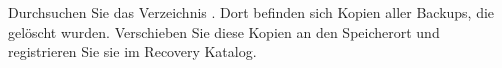     \item Durchsuchen Sie das Verzeichnis . Dort befinden sich Kopien aller Backups, die gel\"oscht wurden. Verschieben Sie diese Kopien an den Speicherort  und registrieren Sie sie im Recovery Katalog.
